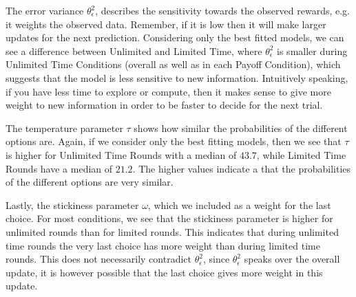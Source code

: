 The error variance  $\theta_\epsilon^2$, describes the sensitivity towards the observed rewards, e.g. it weights the observed data. Remember, if it is low then it will make larger updates for the next prediction. Considering only the best fitted models, we can see a difference between Unlimited and Limited Time, where  $\theta_\epsilon^2$ is smaller during Unlimited Time Conditions (overall as well as in each Payoff Condition), which suggests that the model is less sensitive to new information. 
Intuitively speaking, if you have less time to explore or compute, then it makes sense to give more weight to new information in order to be faster to decide for the next trial.

The temperature parameter $\tau$ shows how similar the probabilities of the different options are. Again, if we consider only the best fitting models, then we see that $\tau$ is higher for Unlimited Time Rounds with a median of $43.7$, while Limited Time Rounds have a median of $21.2$. The higher values indicate a that the probabilities of the different options are very similar. 

Lastly, the stickiness parameter $\omega$, which we included as a weight for the last choice. For most conditions, we see that the stickiness parameter is higher for unlimited rounds than for limited rounds. This indicates that during unlimited time rounds the very last choice has more weight than during limited time rounds. This does not necessarily contradict $\theta_\epsilon^2$, since $\theta_\epsilon^2$ speaks over the overall update, it is however possible that the last choice gives more weight in this update. 


